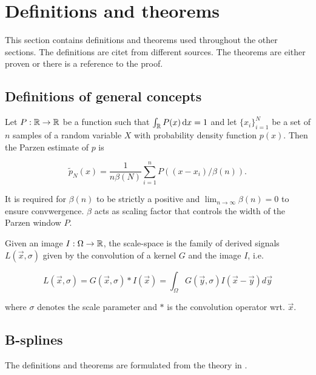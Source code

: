 
\chapter{Definitions and theorems}\label{chapter:defthm}

This section contains definitions and theorems used throughout the other sections. The definitions are citet from different sources. The theorems are either proven or there is a reference to the proof.\\

\section{Definitions of general concepts}
\begin{definition}\label{parzen}
Let $P:\mathbb R\to \mathbb R$ be a function such that $\int_\mathbb R P(x) \,{\rm d} x= 1$ and let $\{x_i\}_{i=1}^N$ be a set of $n$ samples of a random variable $X$ with probability density function $p(x)$. Then the Parzen estimate of $p$ is 

\begin{equation}
\tilde{p}_N(x) = \frac{1}{n\beta(N)}\sum_{i=1}^n P((x-x_i)/\beta(n)).
\end{equation}

It is required for $\beta(n)$ to be strictly a positive and $\lim_{n\to\infty}\beta(n) = 0$ to ensure convwergence. $\beta$ acts as scaling factor that controls the width of the Parzen window $P$. \cite{the.00,parzen.62}
\end{definition}

\begin{definition}\label{scalespace}
Given an image $I:\Omega\to \mathbb R$, the scale-space is the family of derived signals $L(\vec{x},\sigma)$ given by the convolution of a kernel $G$ and the image $I$, i.e.

\begin{equation}
L(\vec{x},\sigma) = G(\vec{x},\sigma)*I(\vec{x}) = \int_{\Omega} G(\vec{y},\sigma)I(\vec{x}-\vec{y})d\vec{y}
\end{equation}

where $\sigma$ denotes the scale parameter and $*$ is the convolution operator wrt. $\vec{x}$.
\end{definition}

\section{B-splines}
The definitions and theorems are formulated from the theory in \cite[chap.~6.5]{kin.02}.\\

